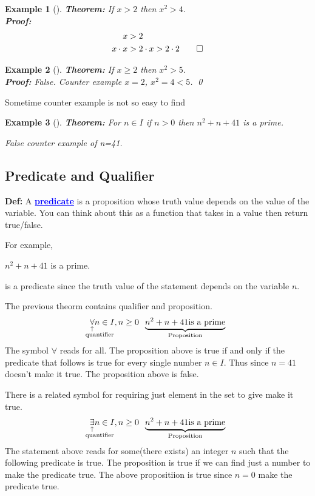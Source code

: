 \documentclass[a4paper, 12pt]{article}
\newcommand{\definition}{\textbf{Def:} }
\newcommand{\theorem}{\textbf{Theorem:} }
\renewcommand{\proof}{\textbf{Proof:} }
\newcommand{\kwd}[1]{\textcolor{blue}{\textbf{\underline{#1}}}}
\newcommand{\expl}[2]{%
	\underset{\substack{\uparrow\\\mathrlap{\text{\hspace{-1em}#2}}}}{#1}}
\theoremstyle{examplestyle}
\newtheorem{examplethm}{Example}
\newenvironment{example}[1][]{\begin{mdframed}[style=example]\begin{examplethm}[#1]}{\end{examplethm}\end{mdframed}}
\begin{document}
\begin{multicols}{2}
\begin{example}
	\theorem If $x>2$ then $x^2>4$.\\
	\setlength{\abovedisplayskip}{-\baselineskip}%
	\setlength{\abovedisplayshortskip}{\abovedisplayskip}%
	\proof \begin{align*}	      
		x &> 2\\
		x\cdot x &> 2 \cdot x > 2 \cdot 2 \qed
	\end{align*}
\end{example}

\begin{example}
	\theorem If $x\ge2$ then $x^2 > 5$.\\
	\proof False. Counter example $x=2$, $x^2 = 4 < 5$. \qed
\end{example}


Sometime counter example is not so easy to find
\begin{example}
	\theorem For $n \in I$ if $n>0$ then $n^2 + n + 41$ is a prime.
	
	False counter example of n=41.
\end{example}

\subsection*{Predicate and Qualifier}

\definition A \kwd{predicate} is a proposition whose truth value depends on the value of the variable. You can think about this as a function that takes in a value then return true/false.

For example,
\begin{center}
	$n^2 +n + 41$ is a prime.
\end{center}
is a predicate since the truth value of the statement depends on the variable $n$.

	The previous theorm contains qualifier and proposition.
\begin{align*}
	\expl{\forall}{\text{quantifier}} n \in I, n \ge 0 \; \; \underbrace{n^2 + n + 41 \text{is a prime}}_{\text{Proposition}}
\end{align*}
The symbol $\forall$ reads for all. The proposition above is true if and only if the predicate that follows is true for every single number $n \in I$. Thus since $n=41$ doesn't make it true. The proposition above is false.

There is a related symbol for requiring just element in the set to give make it true.
\begin{align*}
	\expl{\exists}{\text{quantifier}} n \in I, n \ge 0 \; \; \underbrace{n^2 + n + 41 \text{is a prime}}_{\text{Proposition}}
\end{align*}
The statement above reads for some(there exists) an integer $n$ such that the following predicate is true. The proposition is true if we can find just a number to make the predicate true. The above propositiion is true since $n=0$ make the predicate true.


\end{multicols}
\end{document}
